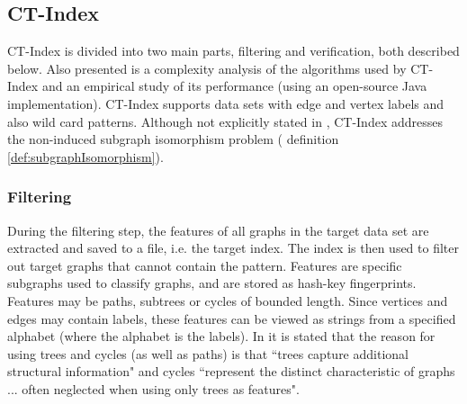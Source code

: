 \documentclass{l4proj}
\begin{document}
\subsection{CT-Index}

%
%
%
CT-Index \cite{ctindex} is divided into two main parts, filtering and verification, both described below. Also presented is a complexity analysis of the algorithms used by CT-Index and an empirical study of its performance (using an open-source Java implementation).
CT-Index supports data sets with edge and vertex labels and also wild card patterns. Although not explicitly stated in \cite{ctindex}, CT-Index addresses the non-induced subgraph isomorphism problem  ( definition \ref{def:subgraphIsomorphism}).

\subsubsection{Filtering}
During the filtering step, the features of all graphs in the target data set are extracted and saved to a file, i.e. the target index. The index is then used to filter out target graphs that cannot contain the pattern.  Features are specific subgraphs used to classify graphs, and are stored as hash-key fingerprints. Features may be paths, subtrees or cycles of bounded length. Since vertices and edges may contain labels, these features can be viewed as strings from a specified alphabet (where the alphabet is the labels). In \cite{ctindex} it is stated that the reason for using trees and cycles (as well as paths) is that ``trees capture additional structural information" and cycles ``represent the distinct characteristic of graphs ... often neglected when using only trees as features".
\end{document}
